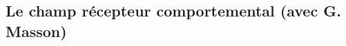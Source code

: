 \documentclass[11pt,french,a4paper,oneside]{article}%
\begin{document}

\subsection{Le champ récepteur comportemental (avec G. Masson)} 

\end{document}
